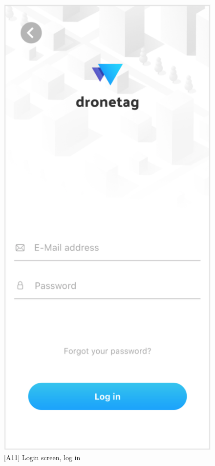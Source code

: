 \begin{figure}
    \centering
    \begin{minipage}{.45\textwidth}
        \centering
        \includegraphics[width=.7\linewidth]{assets/user_interface_design/login/login_screen_log_in.png}
        \caption{[A11] Login screen, log in}
        \label{fig:login_screen_log_in}
    \end{minipage}%
    \hspace{.05\linewidth}
    \begin{minipage}{.45\textwidth}
        \centering

\end{minipage}
\end{figure}

